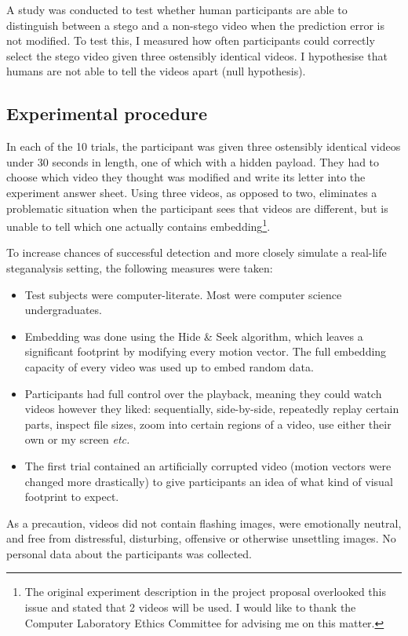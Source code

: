 \documentclass[12pt,british,twoside,notitlepage,usenames,dvipsnames,hypens,final]{report}
\numberwithin{equation}{section}
\numberwithin{figure}{section}
\begin{document}
A study was conducted to test whether human participants are able to distinguish between a stego and a non-stego video when the prediction error is not modified. To test this, I measured how often participants could correctly select the stego video given three ostensibly identical videos. I hypothesise that humans are not able to tell the videos apart (null hypothesis).

\subsection{Experimental procedure}

In each of the 10 trials, the participant was given three ostensibly identical videos under 30 seconds in length, one of which with a hidden payload. They had to choose which video they thought was modified and write its letter into the experiment answer sheet. Using three videos, as opposed to two, eliminates a problematic situation when the participant sees that videos are different, but is unable to tell which one actually contains embedding\footnote{The original experiment description in the project proposal overlooked this issue and stated that 2 videos will be used. I would like to thank the Computer Laboratory Ethics Committee for advising me on this matter.}.

To increase chances of successful detection and more closely simulate a real-life steganalysis setting, the following measures were taken:
\begin{itemize}
\item Test subjects were computer-literate. Most were computer science undergraduates.
\item Embedding was done using the Hide \& Seek algorithm, which leaves a significant footprint by modifying every motion vector. The full embedding capacity of every video was used up to embed random data.  
\item Participants had full control over the playback, meaning they could watch videos however they liked: sequentially, side-by-side, repeatedly replay certain parts, inspect file sizes, zoom into certain regions of a video, use either their own or my screen \emph{etc.}
\item The first trial contained an artificially corrupted video (motion vectors were changed more drastically) to give participants an idea of what kind of visual footprint to expect. 
\end{itemize} 

As a precaution, videos did not contain flashing images, were emotionally neutral, and free from distressful, disturbing, offensive or otherwise unsettling images. No personal data about the participants was collected.
\end{document}
